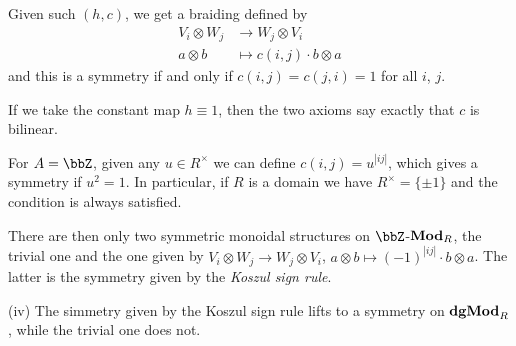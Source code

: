 \documentclass[a4paper,11pt,oneside,openany]{scrbook}
\begin{document}
\begin{exmp}
	Given such $(h,c)$, we get a braiding defined by
	\begin{align*}
		V_i\otimes W_j & \rightarrow W_j\otimes V_i     \\
		a\otimes b     & \mapsto c(i,j)\cdot b\otimes a
	\end{align*}
	and this is a symmetry if and only if $c(i,j)=c(j,i)=1$ for all $i$, $j$.

	If we take the constant map $h\equiv 1$, then the two axioms say exactly that $c$ is bilinear.

	For $A=\bbZ$, given any $u\in R^\times$ we can define $c(i,j)=u^{|ij|}$, which gives a symmetry if $u^2=1$. In particular, if $R$ is a domain we have $R^\times=\{\pm 1\}$ and the condition is always satisfied.

	There are then only two symmetric monoidal structures on $\bbZ$-${\normalfont\textbf{Mod}}_R$, the trivial one and the one given by $V_i\otimes W_j\rightarrow W_j\otimes V_i$, $a\otimes b\mapsto (-1)^{|ij|}\cdot b\otimes a$. The latter is the symmetry given by the \emph{Koszul sign rule}.

	\item[(iv)] The simmetry given by the Koszul sign rule lifts to a symmetry on ${\normalfont\textbf{dgMod}}_R$, while the trivial one does not.
\end{exmp}
\end{document}
